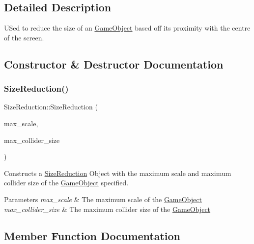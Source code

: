 \subsection{Detailed Description}
U\+Sed to reduce the size of an \hyperlink{class_game_object}{Game\+Object} based off its proximity with the centre of the screen. 

\subsection{Constructor \& Destructor Documentation}
\mbox{\label{class_size_reduction_a2e274f3e867ac457d0fd354351426035}} 
\subsubsection{\texorpdfstring{Size\+Reduction()}{SizeReduction()}}
{\footnotesize\ttfamily Size\+Reduction\+::\+Size\+Reduction (\begin{DoxyParamCaption}\item[{const \hyperlink{structxy_vector}{xy\+Vector} \&}]{max\+\_\+scale,  }\item[{const double \&}]{max\+\_\+collider\+\_\+size }\end{DoxyParamCaption})}



Constructs a \hyperlink{class_size_reduction}{Size\+Reduction} Object with the maximum scale and maximum collider size of the \hyperlink{class_game_object}{Game\+Object} specified. 


\begin{DoxyParams}{Parameters}
{\em max\+\_\+scale} & The maximum scale of the \hyperlink{class_game_object}{Game\+Object} \\
\hline
{\em max\+\_\+collider\+\_\+size} & The maximum collider size of the \hyperlink{class_game_object}{Game\+Object} \\
\hline
\end{DoxyParams}


\subsection{Member Function Documentation}
\mbox{\label{class_size_reduction_aee72365a4e351318fb49ae5c8c6da0f7}} 
